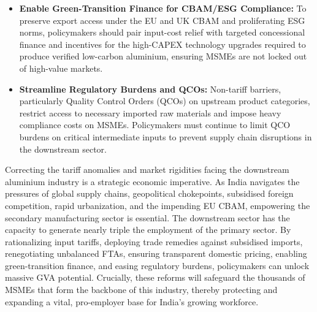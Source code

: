 \documentclass[11pt, a4paper]{article}
\numberwithin{figure}{section}
\numberwithin{table}{section}
\begin{document}
\begin{itemize}
    \item \textbf{Enable Green-Transition Finance for CBAM/ESG Compliance:}
    To preserve export access under the EU and UK CBAM and proliferating ESG norms, policymakers should pair input-cost relief with targeted concessional finance and incentives for the high-CAPEX technology upgrades required to produce verified low-carbon aluminium, ensuring MSMEs are not locked out of high-value markets.

    \item \textbf{Streamline Regulatory Burdens and QCOs:}
    Non-tariff barriers, particularly Quality Control Orders (QCOs) on upstream product categories, restrict access to necessary imported raw materials and impose heavy compliance costs on MSMEs. Policymakers must continue to limit QCO burdens on critical intermediate inputs to prevent supply chain disruptions in the downstream sector.
\end{itemize}

Correcting the tariff anomalies and market rigidities facing the downstream aluminium industry is a strategic economic imperative. As India navigates the pressures of global supply chains, geopolitical chokepoints, subsidised foreign competition, rapid urbanization, and the impending EU CBAM, empowering the secondary manufacturing sector is essential. The downstream sector has the capacity to generate nearly triple the employment of the primary sector. By rationalizing input tariffs, deploying trade remedies against subsidised imports, renegotiating unbalanced FTAs, ensuring transparent domestic pricing, enabling green-transition finance, and easing regulatory burdens, policymakers can unlock massive GVA potential. Crucially, these reforms will safeguard the thousands of MSMEs that form the backbone of this industry, thereby protecting and expanding a vital, pro-employer base for India's growing workforce.
\end{document}

